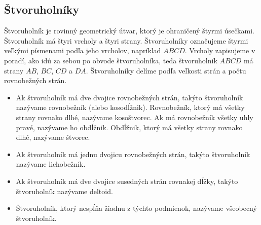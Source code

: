 \documentclass{report}
\begin{document}
\subsection{Štvoruholníky}

Štvoruholník je rovinný geometrický útvar, ktorý je ohraničený štyrmi úsečkami. Štvoruholník má štyri vrcholy a štyri strany. Štvoruholníky označujeme štyrmi veľkými písmenami podľa jeho vrcholov, napríklad \(ABCD\). Vrcholy zapisujeme v poradí, ako idú za sebou po obvode štvoruholníka, teda štvoruholník \(ABCD\) má strany \(AB\), \(BC\), \(CD\) a \(DA\). Štvoruholníky delíme podľa veľkosti strán a počtu rovnobežných strán.
\begin{itemize}
  \item Ak štvoruholník má dve dvojice rovnobežných strán, takýto štvoruholník nazývame rovnobežník (alebo kosodĺžnik). Rovnobežník, ktorý má všetky strany rovnako dlhé, nazývame kosoštvorec. Ak má rovnobežník všetky uhly pravé, nazývame ho obdĺžnik. Obdĺžnik, ktorý má všetky strany rovnako dlhé, nazývame štvorec.
  \item Ak štvoruholník má jednu dvojicu rovnobežných strán, takýto štvoruholník nazývame lichobežník.
  \item Ak štvoruholník má dve dvojice susedných strán rovnakej dĺžky, takýto štvoruholník nazývame deltoid.
  \item Štvoruholník, ktorý nespĺňa žiadnu z týchto podmienok, nazývame všeobecný štvoruholník.
\end{itemize}
\end{document}
